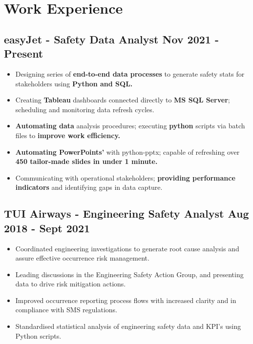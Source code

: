 \documentclass[a4paper,9pt]{article}
\begin{document}
\section*{Work Experience}
\subsection*{\textbf{easyJet - Safety Data Analyst} \hfill  Nov 2021 - Present}
\begin{itemize}[noitemsep]
	\item Designing series of \textbf{end-to-end data processes} to generate safety stats for stakeholders using \textbf{Python and SQL.}
    \item Creating \textbf{Tableau} dashboards connected directly to \textbf{MS SQL Server}; scheduling and monitoring data refresh cycles.
	\item \textbf{Automating data} analysis procedures; executing \textbf{python} scripts via batch files to \textbf{improve work efficiency.}
	\item \textbf{Automating PowerPoints'} with python-pptx; capable of refreshing over \textbf{450 tailor-made slides in under 1 minute.}
	\item Communicating with operational stakeholders; \textbf{providing performance indicators} and identifying gaps in data capture.


\end{itemize}

\subsection*{\textbf{TUI Airways - Engineering Safety Analyst} \hfill  Aug 2018 - Sept 2021}
\begin{itemize}[noitemsep]
	\item Coordinated engineering investigations to generate root cause analysis and assure effective occurrence risk management.
	\item Leading discussions in the Engineering Safety Action Group, and presenting data to drive risk mitigation actions.
	\item Improved occurrence reporting process flows with increased clarity and in compliance with SMS regulations.
	\item Standardised statistical analysis of engineering safety data and KPI's using Python scripts.
\end{itemize}
\end{document}
